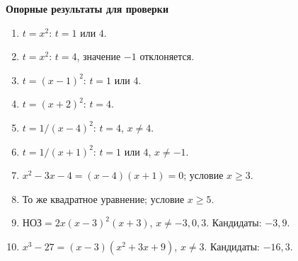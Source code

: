 \documentclass[a4paper,12pt]{article}
\newcommand{\key}[1]{\textbf{\color{darkaccent}#1}}
\begin{document}
\vspace{4mm}
\key{Опорные результаты для проверки}\par
\begin{enumerate}[leftmargin=9mm,itemsep=3pt]
\item \(t=x^2\): \(t=1\) или \(4\).
\item \(t=x^2\): \(t=4\), значение \(-1\) отклоняется.
\item \(t=(x-1)^2\): \(t=1\) или \(4\).
\item \(t=(x+2)^2\): \(t=4\).
\item \(t=1/(x-4)^2\): \(t=4\), \(x\ne4\).
\item \(t=1/(x+1)^2\): \(t=1\) или \(4\), \(x\ne-1\).
\item \(x^2-3x-4=(x-4)(x+1)=0\); условие \(x\ge3\).
\item То же квадратное уравнение; условие \(x\ge5\).
\item \(\text{НОЗ}=2x(x-3)^2(x+3)\), \(x\ne-3,0,3\). Кандидаты: \(-3,9\).
\item \(x^3-27=(x-3)(x^2+3x+9)\), \(x\ne3\). Кандидаты: \(-16,3\).
\end{enumerate}
\end{document}

